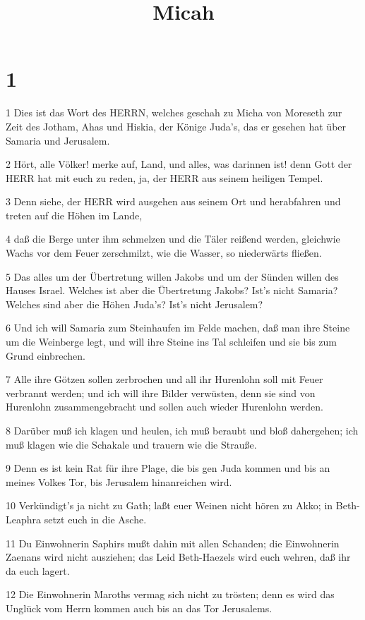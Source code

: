 

\title{Micah}


\chapter{1}

\par 1 Dies ist das Wort des HERRN, welches geschah zu Micha von Moreseth zur Zeit des Jotham, Ahas und Hiskia, der Könige Juda's, das er gesehen hat über Samaria und Jerusalem.
\par 2 Hört, alle Völker! merke auf, Land, und alles, was darinnen ist! denn Gott der HERR hat mit euch zu reden, ja, der HERR aus seinem heiligen Tempel.
\par 3 Denn siehe, der HERR wird ausgehen aus seinem Ort und herabfahren und treten auf die Höhen im Lande,
\par 4 daß die Berge unter ihm schmelzen und die Täler reißend werden, gleichwie Wachs vor dem Feuer zerschmilzt, wie die Wasser, so niederwärts fließen.
\par 5 Das alles um der Übertretung willen Jakobs und um der Sünden willen des Hauses Israel. Welches ist aber die Übertretung Jakobs? Ist's nicht Samaria? Welches sind aber die Höhen Juda's? Ist's nicht Jerusalem?
\par 6 Und ich will Samaria zum Steinhaufen im Felde machen, daß man ihre Steine um die Weinberge legt, und will ihre Steine ins Tal schleifen und sie bis zum Grund einbrechen.
\par 7 Alle ihre Götzen sollen zerbrochen und all ihr Hurenlohn soll mit Feuer verbrannt werden; und ich will ihre Bilder verwüsten, denn sie sind von Hurenlohn zusammengebracht und sollen auch wieder Hurenlohn werden.
\par 8 Darüber muß ich klagen und heulen, ich muß beraubt und bloß dahergehen; ich muß klagen wie die Schakale und trauern wie die Strauße.
\par 9 Denn es ist kein Rat für ihre Plage, die bis gen Juda kommen und bis an meines Volkes Tor, bis Jerusalem hinanreichen wird.
\par 10 Verkündigt's ja nicht zu Gath; laßt euer Weinen nicht hören zu Akko; in Beth-Leaphra setzt euch in die Asche.
\par 11 Du Einwohnerin Saphirs mußt dahin mit allen Schanden; die Einwohnerin Zaenans wird nicht ausziehen; das Leid Beth-Haezels wird euch wehren, daß ihr da euch lagert.
\par 12 Die Einwohnerin Maroths vermag sich nicht zu trösten; denn es wird das Unglück vom Herrn kommen auch bis an das Tor Jerusalems.
